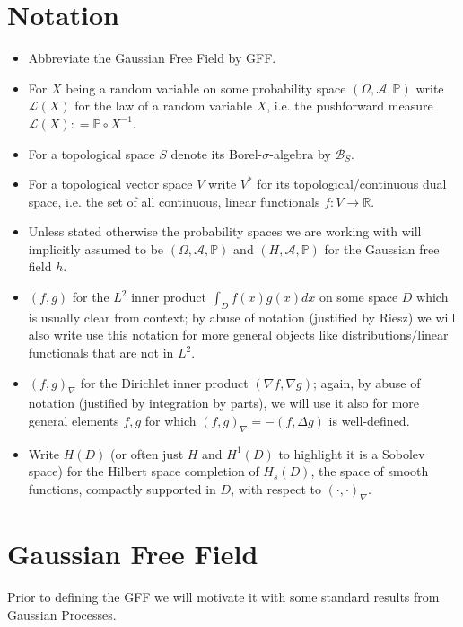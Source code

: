 \documentclass[11pt,reqno]{amsart}
\numberwithin{equation}{section}
\newcommand{\deq}{\mathrel{\mathop:}=}
\begin{document}
\tableofcontents

\section*{Notation}
\begin{itemize}
	\item Abbreviate the Gaussian Free Field by GFF.
	\item For $X$ being a random variable on some probability space $(\Omega, \mathcal A, \mathbb P)$ write $\mathcal L(X)$ for the law of a random variable $X$, i.e. the pushforward measure $\mathcal L(X)\deq \mathbb P\circ X^{-1}$.
	\item For a topological space $S$ denote its Borel-$\sigma$-algebra by $\mathcal B_S$.
	\item For a topological vector space $V$ write $V^*$ for its topological/continuous dual space, i.e. the set of all continuous, linear functionals $f:V\rightarrow\mathbb R$.
	\item Unless stated otherwise the probability spaces we are working with will implicitly assumed to be $(\Omega,\mathcal A,\mathbb P)$ and $(H,\mathcal A, \mathbb P)$ for the Gaussian free field $h$.
	\item $(f,g)$ for the $L^2$ inner product $\int_D f(x)g(x)dx$ on some space $D$ which is usually clear from context; by abuse of notation (justified by Riesz) we will also write use this notation for more general objects like distributions/linear functionals that are not in $L^2$.
	\item $(f,g)_\nabla$ for the Dirichlet inner product $(\nabla f,\nabla g)$; again, by abuse of notation (justified by integration by parts), we will use it also for more general elements $f,g$ for which $(f,g)_\nabla = -(f,\Delta g)$ is well-defined.
	\item Write $H(D)$ (or often just $H$ and $H^1(D)$ to highlight it is a Sobolev space) for the Hilbert space completion of $H_s(D)$, the space of smooth functions, compactly supported in $D$, with respect to $(\cdot,\cdot)_\nabla$.
\end{itemize}

\section{Gaussian Free Field}

Prior to defining the GFF we will motivate it with some standard results from Gaussian Processes.
\end{document}
